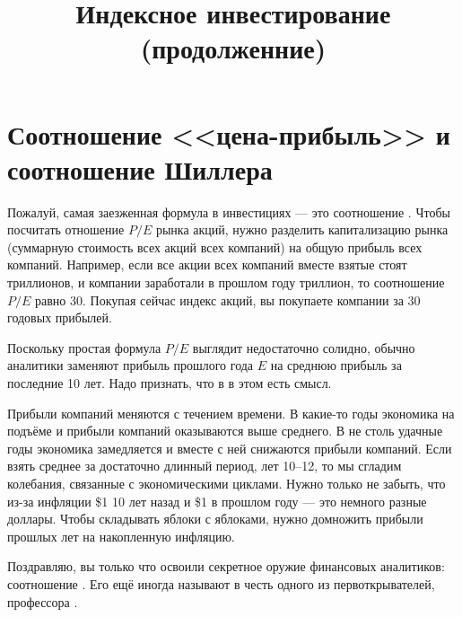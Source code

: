 
\title{Индексное инвестирование (продолженние)}



\section{Соотношение <<цена-прибыль>> и соотношение Шиллера}


Пожалуй, самая заезженная формула в инвестициях --- это соотношение . Чтобы посчитать отношение $P/E$ рынка акций, нужно разделить капитализацию рынка (суммарную стоимость всех акций всех компаний) на общую прибыль всех компаний. Например, если все акции всех компаний вместе взятые стоят  триллионов, и компании заработали в прошлом году  триллион, то соотношение $P/E$ равно 30. Покупая сейчас индекс акций, вы покупаете компании за 30 годовых прибылей.

Поскольку простая формула $P/E$ выглядит недостаточно солидно, обычно аналитики заменяют прибыль прошлого года $E$ на среднюю прибыль за последние 10 лет. Надо признать, что в в этом есть смысл.

Прибыли компаний меняются с течением времени. В какие-то годы экономика на подъёме и прибыли компаний оказываются выше среднего. В не столь удачные годы экономика замедляется и вместе с ней снижаются прибыли компаний. Если взять среднее за достаточно длинный период, лет 10--12, то мы сгладим колебания, связанные с экономическими циклами. Нужно только не забыть, что из-за инфляции \$1 10 лет назад и \$1 в прошлом году --- это немного разные доллары. Чтобы складывать яблоки с яблоками, нужно домножить прибыли прошлых лет на накопленную инфляцию.

Поздравляю, вы только что освоили секретное оружие финансовых аналитиков: соотношение . Его ещё иногда называют  в честь одного из первоткрывателей, профессора  \cite{campbell1988dividend}.

